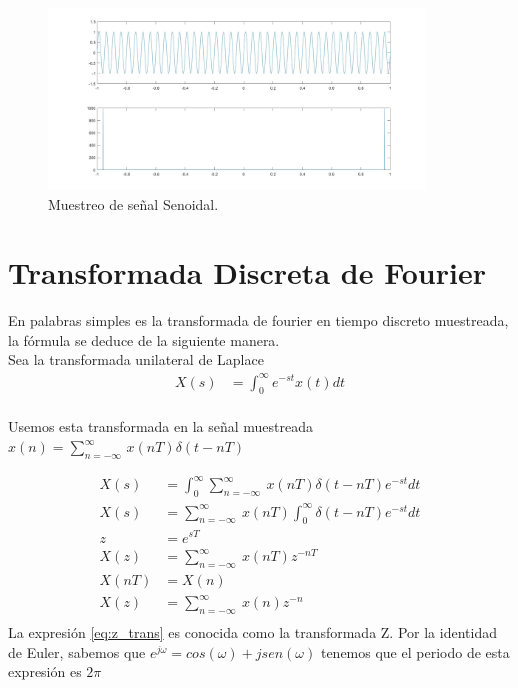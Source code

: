 \documentclass[12pt]{article}
\begin{document}
\begin{figure}[h]
    \centering
        \includegraphics[width=10cm]{IMAGENES/3}
        \caption{Muestreo de señal Senoidal.}
\end{figure}
\vspace{100mm}
\section{Transformada Discreta de Fourier}
En palabras simples es la transformada de fourier en tiempo discreto muestreada, la fórmula se deduce de la siguiente manera.
\\

Sea la transformada unilateral de Laplace
\begin{equation}
    \begin{split}
        X(s)&=\int _{0}^{\infty} e^{-st}x(t)dt\\
    \end{split}
    \label{eq:unila_laplace}
\end{equation}

Usemos esta transformada en la señal muestreada $x(n)=\displaystyle\sum_{n=-\infty}^{\infty}\,x(nT)\delta(t-nT)$

\begin{equation}
    \begin{split}
        X(s)&=\int _{0}^{\infty} \displaystyle\sum_{n=-\infty}^{\infty}\ x(nT)\delta(t-nT)e^{-st}dt\\
        X(s)&=\displaystyle\sum_{n=-\infty}^{\infty}\ x(nT)\int _{0}^{\infty}\delta(t-nT)e^{-st}dt\\ 
        z&=e^{sT}\\
        X(z)&=\displaystyle\sum_{n=-\infty}^{\infty}\ x(nT)z^{-nT}\\
        X(nT)&=X(n)\\
        X(z)&=\displaystyle\sum_{n=-\infty}^{\infty}\ x(n)z^{-n}\\    
    \end{split}
    \label{eq:z_trans}
\end{equation}
La expresión \ref{eq:z_trans} es conocida como la transformada Z. Por la identidad de Euler, sabemos que $e^{j\omega}=cos(\omega)+jsen(\omega)$ tenemos que el periodo de esta expresión es $2\pi$
\end{document}
